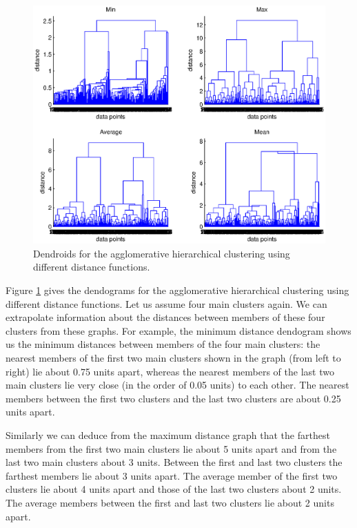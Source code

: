 \documentclass[10pt]{article}
\begin{document}
\subsection{}
\begin{figure}
	\includegraphics[width=\columnwidth]{Ass2_2.eps}
	\caption{Dendroids for the agglomerative hierarchical clustering using different distance functions.}
	\label{fig2b}
\end{figure}
Figure \ref{fig2b} gives the dendograms for the agglomerative hierarchical clustering using different distance functions. Let us assume four main clusters again. We can extrapolate information about the distances between members of these four clusters from these graphs. For example, the minimum distance dendogram shows us the minimum distances between members of the four main clusters: the nearest members of the first two main clusters shown in the graph (from left to right) lie about 0.75 units apart, whereas the nearest members of the last two main clusters lie very close (in the order of 0.05 units) to each other. The nearest members between the first two clusters and the last two clusters are about 0.25 units apart. 

Similarly we can deduce from the maximum distance graph that the farthest members from the first two main clusters lie about 5 units apart and from the last two main clusters about 3 units. Between the first and last two clusters the farthest members lie about 3 units apart. The average member of the first two clusters lie about 4 units apart and those of the last two clusters about 2 units. The average members between the first and last two clusters lie about 2 units apart.
\end{document}
